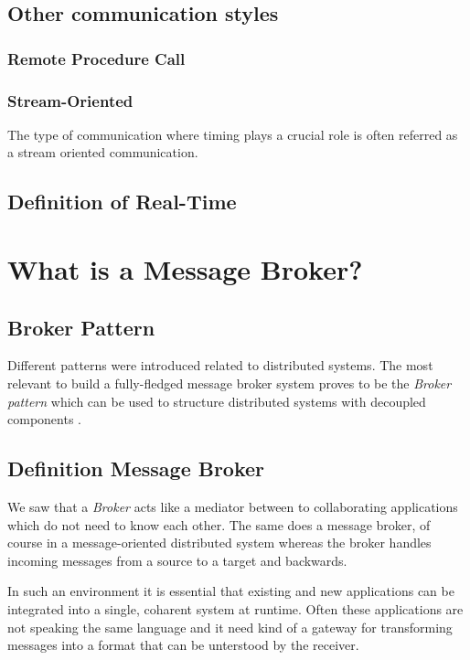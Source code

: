 \subsection{Other communication styles} \subsubsection{Remote Procedure Call}

\subsubsection{Stream-Oriented}
The type of communication where timing plays a crucial role is often referred as a
stream oriented communication. 


\subsection{Definition of Real-Time}

\section{What is a Message Broker?}

\subsection{Broker Pattern} 
Different patterns were introduced related to distributed systems. The most
relevant to build a fully-fledged message broker system proves to be the
\textit{Broker pattern} which can be used to structure distributed systems with
decoupled components \cite{POSA1}. 

\subsection{Definition Message Broker}
We saw that a \textit{Broker} acts like a mediator between to collaborating
applications which do not need to know each other. The same does a message
broker, of course in a message-oriented distributed system whereas the broker
handles incoming messages from a source to a target and backwards. 

In such an environment it is essential that existing and new applications can be
integrated into a single, coharent system at runtime. Often these applications
are not speaking the same language and it need kind of a gateway for
transforming messages into a format that can be unterstood by the receiver.
\cite{TAN06}

